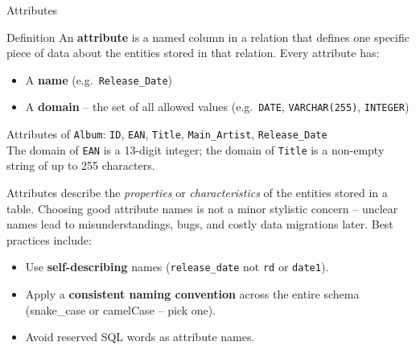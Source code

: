 \begin{frame}{Attributes}
  \begin{block}{Definition}
    An \textbf{attribute} is a named column in a relation that defines one
    specific piece of data about the entities stored in that relation.
    Every attribute has:
    \begin{itemize}
      \item A \textbf{name} (e.g.\ \texttt{Release\_Date})
      \item A \textbf{domain} -- the set of all allowed values
            (e.g.\ \texttt{DATE}, \texttt{VARCHAR(255)}, \texttt{INTEGER})
    \end{itemize}
  \end{block}

  \begin{examples}{}
    Attributes of \texttt{Album}:
    \texttt{ID}, \texttt{EAN}, \texttt{Title}, \texttt{Main\_Artist},
    \texttt{Release\_Date}\\[4pt]
    The domain of \texttt{EAN} is a 13-digit integer;
    the domain of \texttt{Title} is a non-empty string of up to 255 characters.
  \end{examples}

  Attributes describe the \emph{properties} or \emph{characteristics} of the
  entities stored in a table.  Choosing good attribute names is not a minor
  stylistic concern -- unclear names lead to misunderstandings, bugs, and
  costly data migrations later.  Best practices include:
  \begin{itemize}
    \item Use \textbf{self-describing} names (\texttt{release\_date} not
          \texttt{rd} or \texttt{date1}).
    \item Apply a \textbf{consistent naming convention} across the entire
          schema (snake\_case or camelCase -- pick one).
    \item Avoid reserved SQL words as attribute names.
  \end{itemize}
\end{frame}

